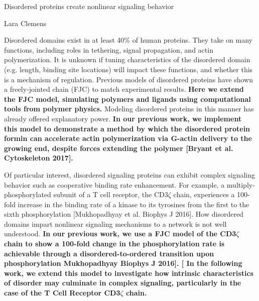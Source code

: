 \documentclass[onecolumn]{article}
\begin{document}
\newcommand{\citel}[1]{\citep{#1}}
\newcommand{\citelt}[1]{\citet{#1}}

\def\Tevac{T_{1/2}^{\mbox{\,\scriptsize evac}}}
\def\Treturn{T_{1/2}^{\mbox{\,\scriptsize return}}}
\def\toffbar{\bar{t}_{\mbox{\scriptsize off}}}
\def\toff{{t}_{\mbox{\scriptsize off}}}
\def\Peclet{P\'{e}clet}


\begin{center}
\Large
Disordered proteins create nonlinear signaling behavior

\large
Lara Clemens
\date{}

\end{center}
\normalsize


Disordered domains exist in at least 40\% of human proteins. 
They take on many functions, including roles in tethering, signal propagation, and actin polymerization. 
It is unknown if tuning characteristics of the disordered domain (e.g. length, binding site locations) will impact these functions, and whether this is a mechanism of regulation.  
Previous models of disordered proteins have shown a freely-jointed chain (FJC) to match experimental results. 
\textbf{Here we extend the FJC model, simulating polymers and ligands using computational tools from polymer physics. }
Modeling disordered proteins in this manner has already offered explanatory power. \textbf{In our previous work, we implement this model to demonstrate a method by which the disordered protein formin can accelerate actin polymerization via G-actin delivery to the growing end, despite forces extending the polymer [Bryant et al. Cytoskeleton 2017]. }

Of particular interest, disordered signaling proteins can exhibit complex signaling behavior such as cooperative binding rate enhancement. For example, a multiply-phosphorylated subunit of a T cell receptor, the CD3$\zeta$ chain, experiences a 100-fold increase in the binding rate of a kinase to its tyrosines from the first to the sixth phosphorylation [Mukhopadhyay et al. Biophys J 2016].  How disordered domains impart nonlinear signaling mechanisms to a network is not well understood. \textbf{In our previous work, we use a FJC model of the CD3$\zeta$ chain to show a 100-fold change in the phosphorylation rate is achievable through a disordered-to-ordered transition upon phosphorylation Mukhopadhyay Biophys J 2016]. [ In the following work, we extend this model to investigate how intrinsic characteristics of disorder may culminate in complex signaling, particularly in the case of the T Cell Receptor CD3$\zeta$ chain.}
\end{document}
